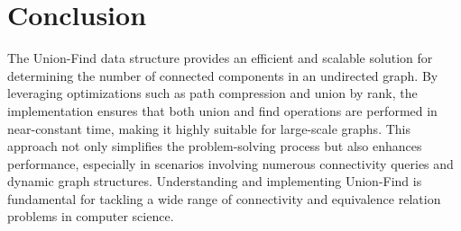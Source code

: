 \section*{Conclusion}

The Union-Find data structure provides an efficient and scalable solution for determining the number of connected components in an undirected graph. By leveraging optimizations such as path compression and union by rank, the implementation ensures that both union and find operations are performed in near-constant time, making it highly suitable for large-scale graphs. This approach not only simplifies the problem-solving process but also enhances performance, especially in scenarios involving numerous connectivity queries and dynamic graph structures. Understanding and implementing Union-Find is fundamental for tackling a wide range of connectivity and equivalence relation problems in computer science.

\printindex

% 
% 
% 
% 